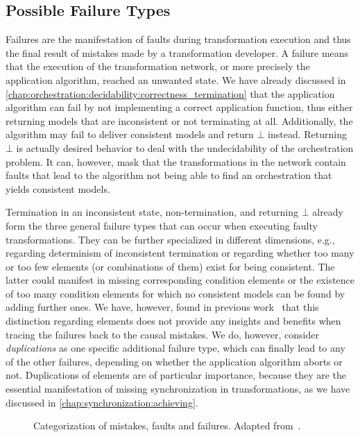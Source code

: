 \subsection{Possible Failure Types}
\label{chap:errors:categorization:failures}

Failures are the manifestation of faults during transformation execution and thus the final result of mistakes made by a transformation developer.
A failure means that the execution of the transformation network, or more precisely the application algorithm, reached an unwanted state.
We have already discussed in \autoref{chap:orchestration:decidability:correctness_termination} that the application algorithm can fail by not implementing a correct application function, thus either returning models that are inconsistent or not terminating at all.
Additionally, the algorithm may fail to deliver consistent models and return $\bot$ instead.
Returning $\bot$ is actually desired behavior to deal with the undecidability of the orchestration problem.
It can, however, mask that the transformations in the network contain faults that lead to the algorithm not being able to find an orchestration that yields consistent models.

Termination in an inconsistent state, non-termination, and returning $\bot$ already form the three general failure types that can occur when executing faulty transformations.
They can be further specialized in different dimensions, e.g., regarding determinism of inconsistent termination or regarding whether too many or too few elements (or combinations of them) exist for being consistent.
The latter could manifest in missing corresponding condition elements or the existence of too many condition elements for which no consistent models can be found by adding further ones.
We have, however, found in previous work~ that this distinction regarding elements does not provide any insights and benefits when tracing the failures back to the causal mistakes.
We do, however, consider \emph{duplications} as one specific additional failure type, which can finally lead to any of the other failures, depending on whether the application algorithm aborts or not.
Duplications of elements are of particular importance, because they are the essential manifestation of missing synchronization in transformations, as we have discussed in \autoref{chap:synchronization:achieving}.

\begin{figure}
    \centering
    
    \caption[Categorization of mistakes, faults and failures]{Categorization of mistakes, faults and failures. Adapted from~.}
    \label{fig:errors:categorization}
\end{figure}

